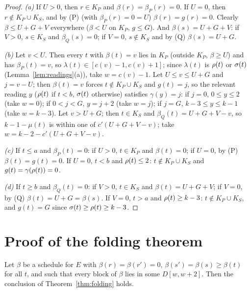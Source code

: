 \begin{proof}
\emph{(a)} If $U>0$, then $r\in K_P$ and $\beta(r)=\beta_P(r)=0$. If $U=0$, then $r\notin K_P\cup K_S$, and by (P) (with $\beta_P(r)=0=U$)
$\beta(r)=g(r)=0$. Clearly $\beta\le U+G+V$ everywhere ($\beta<U$ on $K_P$, $g\le G$). And $\beta(s)=U+G+V$: if $V>0$, $s\in K_S$ and
$\beta_Q(s)=0$; if $V=0$, $s\notin K_S$ and by (Q) $\beta(s)=U+G$.

\emph{(b)} Let $v<U$. Then every $t$ with $\beta(t)=v$ lies in $K_P$ (outside $K_P$, $\beta\ge U$) and has $\beta_P(t)=v$, so
$\lambda(t)\in[c(v)-1,c(v)+1]$; since $\lambda(t)$ is $\rho(t)$ or $\sigma(t)$ (Lemma~\ref{lem:readings}(a)), take $w=c(v)-1$. Let $U\le
v\le U+G$ and $j=v-U$; then $\beta(t)=v$ forces $t\notin K_P\cup K_S$ and $g(t)=j$, so the relevant reading $y$ ($\rho(t)$ if $t<b$, $\sigma(t)$
otherwise) satisfies $\gamma(y)=j$: if $j=0$, $0\le y\le2$ (take $w=0$); if $0<j<G$, $y=j+2$ (take $w=j$); if $j=G$, $k-3\le y\le k-1$ (take
$w=k-3$). Let $v>U+G$; then $t\in K_S$ and $\beta_Q(t)=U+G+V-v$, so $k-1-\mu(t)$ is within one of $c'(U+G+V-v)$; take $w=k-2-c'(U+G+V-v)$.

\emph{(c)} If $t\le a$ and $\beta_P(t)=0$: if $U>0$, $t\in K_P$ and $\beta(t)=0$; if $U=0$, by (P) $\beta(t)=g(t)=0$. If $U=0$, $t<b$ and
$\rho(t)\le2$: $t\notin K_P\cup K_S$ and $g(t)=\gamma(\rho(t))=0$.

\emph{(d)} If $t\ge b$ and $\beta_Q(t)=0$: if $V>0$, $t\in K_S$ and $\beta(t)=U+G+V$; if $V=0$, by (Q) $\beta(t)=U+G=\beta(s)$. If $V=0$,
$t>a$ and $\rho(t)\ge k-3$: $t\notin K_P\cup K_S$, and $g(t)=G$ since $\sigma(t)\ge\rho(t)\ge k-3$.
\end{proof}


\section{Proof of the folding theorem}\label{sec:fold-proof}

\begin{lemma}\label{lem:assemble}
Let $\beta$ be a schedule for $E$ with $\beta(r)=\beta(r')=0$, $\beta(s')=\beta(s)\ge\beta(t)$ for all $t$, and such that every block of
$\beta$ lies in some $D[w,w+2]$. Then the conclusion of Theorem~\ref{thm:folding} holds.
\end{lemma}

